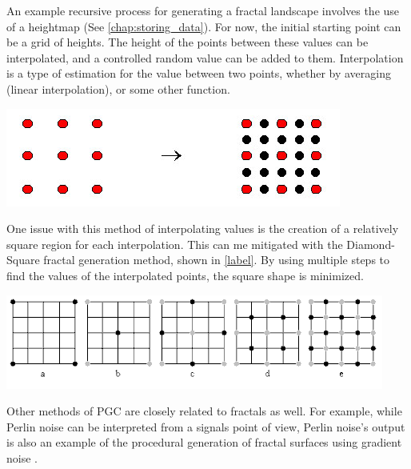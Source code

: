 \documentclass[10pt]{report}
\begin{document}
		An example recursive process for generating a fractal landscape involves the use of a heightmap (See \autoref{chap:storing_data}). For now, the initial starting point can be a grid of heights. The height of the points between these values can be interpolated, and a controlled random value can be added to them. Interpolation is a type of estimation for the value between two points, whether by averaging (linear interpolation), or some other function. 
		
		\begin{minipage}{\textwidth}
			\centering
			\includegraphics[scale=0.5]{m_alg1}
			\label{fig:m_alg1}
		\end{minipage}
	
		One issue with this method of interpolating values is the creation of a relatively square region for each interpolation. This can me mitigated with the Diamond-Square fractal generation method, shown in \autoref{label}. By using multiple steps to find the values of the interpolated points, the square shape is minimized. 
	
		\begin{minipage}{\textwidth}
			\centering
			\includegraphics[scale=1.0]{diamond_square}
			\label{fig:diamond_square}
		\end{minipage}
		
		Other methods of PGC are closely related to fractals as well. For example, while Perlin noise can be interpreted from a signals point of view, Perlin noise's output is also an example of the procedural generation of fractal surfaces using gradient noise \cite{fractal-landscapes}.
		
\end{document}
